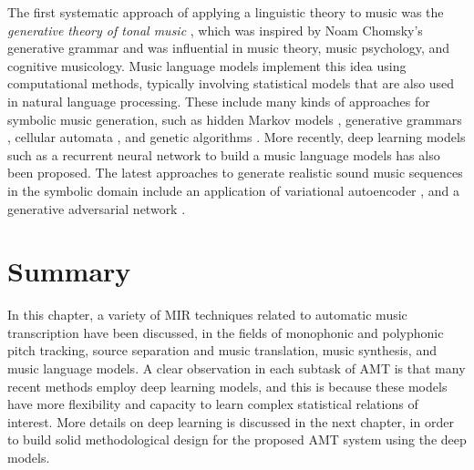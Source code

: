 The first systematic approach of applying a linguistic theory to music was the \emph{generative theory of tonal music} \cite{lerdahl1983gttm}, which was inspired by Noam Chomsky's generative grammar \cite{chomsky1966generative} and was influential in music theory, music psychology, and cognitive musicology.
Music language models implement this idea using computational methods, typically involving statistical models that are also used in natural language processing.
These include many kinds of approaches for symbolic music generation, such as hidden Markov models \cite{farbood2001markov}, generative grammars \cite{chemilier2001grammar}, cellular automata \cite{burraston2004automata}, and genetic algorithms \cite{miranda2007evolutionary}.
More recently, deep learning models such as a recurrent neural network to build a music language models \cite{sigtia2014lm} has also been proposed.
The latest approaches to generate realistic sound music sequences in the symbolic domain include an application of variational autoencoder \cite{teng2017generating,tikhonov2017generation}, and a generative adversarial network \cite{yang2017midinet}.

\section{Summary}

In this chapter, a variety of MIR techniques related to automatic music transcription have been discussed, in the fields of monophonic and polyphonic pitch tracking, source separation and music translation, music synthesis, and music language models.
A clear observation in each subtask of AMT is that many recent methods employ deep learning models, and this is because these models have more flexibility and capacity to learn complex statistical relations of interest.
More details on deep learning is discussed in the next chapter, in order to build solid methodological design for the proposed AMT system using the deep models.